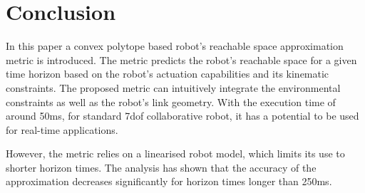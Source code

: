 \section{Conclusion}
In this paper a convex polytope based robot's reachable space approximation metric is introduced. The metric predicts the robot's reachable space for a given time horizon based on the robot's actuation capabilities and its kinematic constraints. The proposed metric can intuitively integrate the environmental constraints as well as the robot's link geometry. With the execution time of around 50ms, for standard 7dof collaborative robot, it has a potential to be used for real-time applications. 

However, the metric relies on a linearised robot model, which limits its use to shorter horizon times. The analysis has shown that the accuracy of the approximation decreases significantly for horizon times longer than 250ms. 